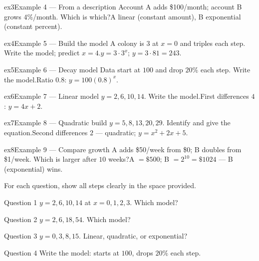 \documentclass[11pt]{article}
\begin{document}
\begin{example}{ex3}{Example 4 --- From a description}
Account A adds \$100/month; account B grows $4\%$/month. Which is which?\soln A linear (constant amount), B exponential (constant percent).
\end{example}

\begin{example}{ex4}{Example 5 --- Build the model}
A colony is $3$ at $x=0$ and triples each step. Write the model; predict $x=4$.\soln $y=3\cdot3^{x}$; $y=3\cdot81=243$.
\end{example}

\begin{example}{ex5}{Example 6 --- Decay model}
Data start at $100$ and drop $20\%$ each step. Write the model.\soln Ratio $0.8$: $y=100(0.8)^{x}$.
\end{example}

\begin{example}{ex6}{Example 7 --- Linear model}
$y=2,6,10,14$. Write the model.\soln First differences $4$: $y=4x+2$.
\end{example}

\begin{example}{ex7}{Example 8 --- Quadratic build}
$y=5,8,13,20,29$. Identify and give the equation.\soln Second differences $2$ — quadratic; $y=x^2+2x+5$.
\end{example}

\begin{example}{ex8}{Example 9 --- Compare growth}
A adds \$50/week from \$0; B doubles from \$1/week. Which is larger after $10$ weeks?\soln A $=\$500$; B $=2^{10}=\$1024$ — B (exponential) wins.
\end{example}

\clearpage
{}
For each question, show all steps clearly in the space provided.

\begin{qbox}{Question 1}
$y=2,6,10,14$ at $x=0,1,2,3$. Which model?\workspace{2.4cm}
\end{qbox}

\begin{qbox}{Question 2}
$y=2,6,18,54$. Which model?\workspace{2.4cm}
\end{qbox}

\begin{qbox}{Question 3}
$y=0,3,8,15$. Linear, quadratic, or exponential?\workspace{2.4cm}
\end{qbox}

\begin{qbox}{Question 4}
Write the model: starts at $100$, drops $20\%$ each step.\workspace{2.4cm}
\end{qbox}
\end{document}
